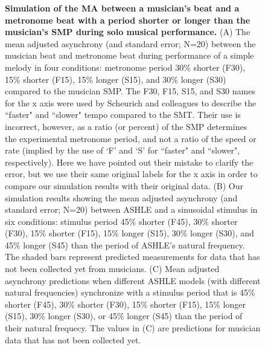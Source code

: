 \documentclass[10pt,letterpaper]{article}
\begin{document}
\begin{figure}[!h]
\caption{{\bf Simulation of the MA between a musician's beat and a metronome beat with a period shorter or longer than the musician's SMP during solo musical performance.} (A) The mean adjusted asynchrony (and standard error; N=20) between the musician beat and metronome beat during performance of a simple melody in four conditions: metronome period 30\% shorter (F30), 15\% shorter (F15), 15\% longer (S15), and 30\% longer (S30) compared to the musician SMP. The F30, F15, S15, and S30 names for the x axis were used by Scheurich and colleagues \cite{scheurich2018tapping} to describe the ``faster" and ``slower" tempo compared to the SMT. Their use is incorrect, however, as a ratio (or percent) of the SMP determines the experimental metronome period, and not a ratio of the speed or rate (implied by the use of `F' and `S' for ``faster" and ``slower", respectively). Here we have pointed out their mistake to clarify the error, but we use their same original labels for the x axis in order to compare our simulation results with their original data. (B) Our simulation results showing the mean adjusted asynchrony (and standard error; N=20) between ASHLE and a sinusoidal stimulus in six conditions: stimulus period 45\% shorter (F45), 30\% shorter (F30), 15\% shorter (F15), 15\% longer (S15), 30\% longer (S30), and 45\% longer (S45) than the period of ASHLE's natural frequency. The shaded bars represent predicted measurements for data that has not been collected yet from musicians. (C) Mean adjusted asynchrony predictions when different ASHLE models (with different natural frequencies) synchronize with a stimulus period that is 45\% shorter (F45), 30\% shorter (F30), 15\% shorter (F15), 15\% longer (S15), 30\% longer (S30), or 45\% longer (S45) than the period of their natural frequecy. The values in (C) are predictions for musician data that has not been collected yet.}
\label{fig2}
\end{figure}
\end{document}
